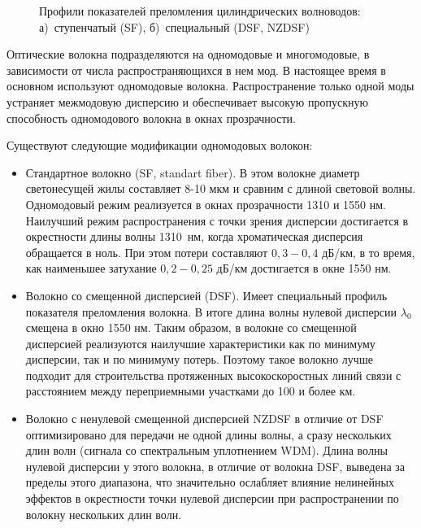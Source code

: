 \begin{figure}[h!]
	\begin{minipage}[h]{0.49\linewidth}
	\end{minipage}
	\hfill
	\begin{minipage}[h]{0.49\linewidth}
	\end{minipage}
	\caption{Профили показателей преломления цилиндрических волноводов: а)~ступенчатый (SF), б)~специальный (DSF, NZDSF)}
	\label{planars}
\end{figure}

Оптические волокна подразделяются на одномодовые и многомодовые, в зависимости от числа распространяющихся в нем мод. В настоящее время в основном используют одномодовые волокна. Распространение только одной моды устраняет межмодовую дисперсию и обеспечивает высокую пропускную  способность одномодового волокна в окнах прозрачности.

Существуют следующие модификации одномодовых волокон:
\begin{itemize}
\item Стандартное  волокно (SF, standart fiber). В этом волокне диаметр светонесущей жилы составляет 8-10 мкм и сравним с длиной световой волны. Одномодовый  режим  реализуется  в  окнах  прозрачности 1310 и 1550 нм. Наилучший  режим  распространения  с точки зрения дисперсии достигается  в  окрестности  длины  волны 1310~нм,  когда  хроматическая  дисперсия обращается в ноль. При этом потери составляют $0,3-0,4$ дБ/км,  в  то  время,  как  наименьшее  затухание $0,2-0,25$ дБ/км достигается в окне 1550 нм. 
\item Волокно со смещенной дисперсией (DSF). Имеет специальный профиль показателя преломления волокна. В итоге длина  волны  нулевой  дисперсии $\lambda_0$ смещена в окно 1550 нм. Таким  образом,  в  волокне  со  смещенной дисперсией реализуются наилучшие характеристики как по минимуму дисперсии, так и по минимуму  потерь.  Поэтому  такое  волокно  лучше  подходит  для  строительства протяженных  высокоскоростных  линий  связи  с  расстоянием  между  переприемными участками до 100 и более км. 
\item Волокно  с  ненулевой  смещенной  дисперсией NZDSF  в  отличие  от DSF 
оптимизировано  для  передачи  не  одной  длины  волны,  а  сразу  нескольких  длин  волн 
(сигнала  со  спектральным  уплотнением WDM). Длина волны нулевой дисперсии у этого волокна, в отличие от волокна DSF, выведена за пределы этого диапазона, что значительно ослабляет влияние нелинейных эффектов в окрестности точки нулевой дисперсии при распространении по волокну нескольких длин волн.
\end{itemize}    

